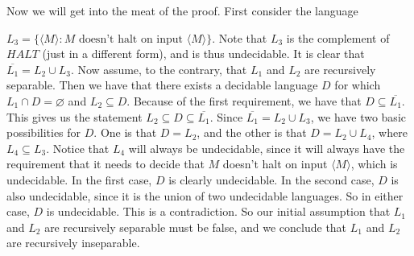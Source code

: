 \documentclass{article}
\begin{document}
Now we will get into the meat of the proof. First consider the language

\noindent $L_{3} = \{\langle M \rangle : M \text{ doesn't halt on input }
\langle M \rangle\}$. Note that $L_{3}$ is the complement of $HALT$ (just in
a different form), and is thus undecidable.
It is clear that $\overline{L_{1}} = L_{2} \cup L_{3}$.
Now assume, to the contrary, that $L_{1}$ and $L_{2}$ are recursively
separable. Then we have that there exists a decidable language $D$
for which $L_{1} \cap D = \varnothing$ and $L_{2} \subseteq D$. Because
of the first requirement, we have that $D \subseteq \overline{L_{1}}$.
This gives us the statement $L_{2} \subseteq D \subseteq \overline{L_{1}}$.
Since $\overline{L_{1}} = L_{2} \cup L_{3}$, we have two basic possibilities
for $D$.  One is that $D = L_{2}$, and the other is
that $D = L_{2} \cup L_{4}$, where $L_{4} \subseteq L_{3}$. Notice that
$L_{4}$ will always be undecidable, since it will always have the requirement
that it needs to decide that $M$ doesn't halt on input $\langle M \rangle$,
which is undecidable.
In the first case, $D$ is clearly undecidable. In the second case,
$D$ is also undecidable, since it is the union of two undecidable
languages. So in either case, $D$ is undecidable. This is a contradiction.
So our initial assumption that $L_{1}$ and $L_{2}$ are recursively separable
must be false, and we conclude that $L_{1}$ and $L_{2}$ are recursively
inseparable.
\newpage

\end{document}
